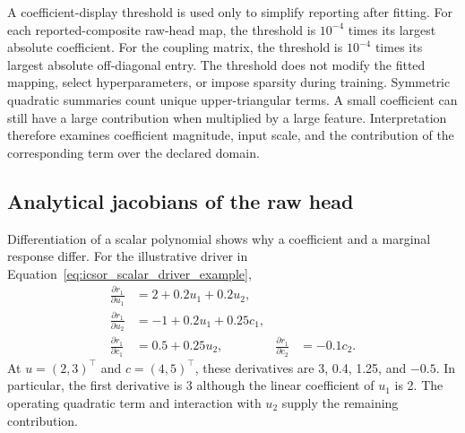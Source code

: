 A coefficient-display threshold is used only to simplify reporting after fitting. For each reported-composite raw-head map, the threshold is \(10^{-4}\) times its largest absolute coefficient. For the coupling matrix, the threshold is \(10^{-4}\) times its largest absolute off-diagonal entry. The threshold does not modify the fitted mapping, select hyperparameters, or impose sparsity during training. Symmetric quadratic summaries count unique upper-triangular terms. A small coefficient can still have a large contribution when multiplied by a large feature. Interpretation therefore examines coefficient magnitude, input scale, and the contribution of the corresponding term over the declared domain.

\subsection{Analytical jacobians of the raw head}

Differentiation of a scalar polynomial shows why a coefficient and a marginal response differ. For the illustrative driver in Equation~\eqref{eq:icsor_scalar_driver_example},
\begin{equation}
\label{eq:icsor_scalar_driver_derivatives}
\begin{aligned}
\frac{\partial r_1}{\partial u_1}&=2+0.2u_1+0.2u_2,\\
\frac{\partial r_1}{\partial u_2}&=-1+0.2u_1+0.25c_1,\\
\frac{\partial r_1}{\partial c_1}&=0.5+0.25u_2,
&\frac{\partial r_1}{\partial c_2}&=-0.1c_2.
\end{aligned}
\end{equation}
At \(u=(2,3)^\top\) and \(c=(4,5)^\top\), these derivatives are 3, 0.4, 1.25, and \(-0.5\). In particular, the first derivative is 3 although the linear coefficient of \(u_1\) is 2. The operating quadratic term and interaction with \(u_2\) supply the remaining contribution.

